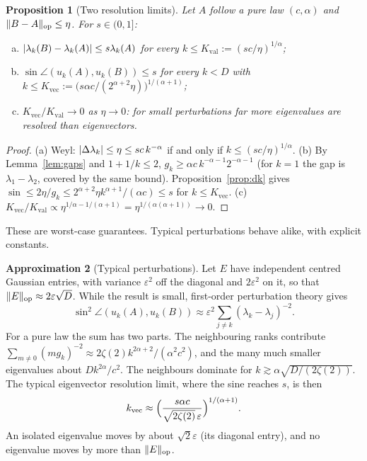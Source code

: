 \documentclass[11pt,a4paper]{article}
\DeclarePairedDelimiter{\norm}{\lVert}{\rVert}
\DeclarePairedDelimiter{\abs}{\lvert}{\rvert}
\newcommand{\op}{\mathrm{op}}
\theoremstyle{plain}
\newtheorem{proposition}{Proposition}[section]
\theoremstyle{definition}
\newtheorem{approximation}[proposition]{Approximation}
\theoremstyle{remark}
\begin{document}
\begin{proposition}[Two resolution limits]\label{prop:resolution}
Let $A$ follow a pure law $(c,\alpha)$ and $\norm{B-A}_\op\le\eta$. For $s\in(0,1]$:
\begin{enumerate}[(a)]
\item $\abs{\lambda_k(B)-\lambda_k(A)}\le s\lambda_k(A)$ for every $k\le K_{\text{val}}:=(sc/\eta)^{1/\alpha}$;
\item $\sin\angle(u_k(A),u_k(B))\le s$ for every $k<D$ with $k\le K_{\text{vec}}:=\bigl(s\alpha c/(2^{\alpha+2}\eta)\bigr)^{1/(\alpha+1)}$;
\item $K_{\text{vec}}/K_{\text{val}}\to0$ as $\eta\to0$: for small perturbations far more eigenvalues are resolved
  than eigenvectors.
\end{enumerate}
\end{proposition}
\begin{proof}
(a) Weyl: $\abs{\Delta\lambda_k}\le\eta\le sc\,k^{-\alpha}$ if and only if $k\le(sc/\eta)^{1/\alpha}$.
(b) By Lemma~\ref{lem:gaps} and $1+1/k\le2$, $g_k\ge\alpha c\,k^{-\alpha-1}2^{-\alpha-1}$ (for $k=1$ the gap is
$\lambda_1-\lambda_2$, covered by the same bound). Proposition~\ref{prop:dk} gives
$\sin\le2\eta/g_k\le2^{\alpha+2}\eta k^{\alpha+1}/(\alpha c)\le s$ for $k\le K_{\text{vec}}$.
(c) $K_{\text{vec}}/K_{\text{val}}\propto\eta^{1/\alpha-1/(\alpha+1)}=\eta^{1/(\alpha(\alpha+1))}\to0$.
\end{proof}

These are worst-case guarantees. Typical perturbations behave alike, with explicit constants.

\begin{approximation}[Typical perturbations]\label{approx:typical}
Let $E$ have independent centred Gaussian entries, with variance $\varepsilon^2$ off the diagonal and $2\varepsilon^2$
on it, so that $\norm{E}_\op\approx2\varepsilon\sqrt D$. While the result is small, first-order perturbation theory
gives
\[
\sin^2\angle(u_k(A),u_k(B))\approx\varepsilon^2\sum_{j\ne k}(\lambda_k-\lambda_j)^{-2}.
\]
For a pure law the sum has two parts. The neighbouring ranks contribute
$\sum_{m\ne0}(mg_k)^{-2}\approx2\zeta(2)k^{2\alpha+2}/(\alpha^2c^2)$, and the many much smaller eigenvalues about
$Dk^{2\alpha}/c^2$. The neighbours dominate for $k\gtrsim\alpha\sqrt{D/(2\zeta(2))}$. The typical eigenvector
resolution limit, where the sine reaches $s$, is then
\[
k_{\text{vec}}\approx\Bigl(\frac{s\alpha c}{\sqrt{2\zeta(2)}\,\varepsilon}\Bigr)^{1/(\alpha+1)}.
\]
An isolated eigenvalue moves by about $\sqrt2\varepsilon$ (its diagonal entry), and no eigenvalue moves by more than
$\norm{E}_\op$.
\end{approximation}
\end{document}
